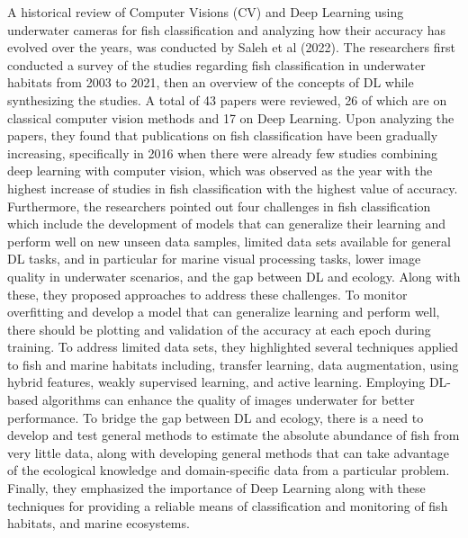 A historical review of Computer Visions (CV) and Deep Learning using underwater cameras for fish classification and analyzing how their accuracy has evolved over the years, was conducted by Saleh et al (2022). The researchers first conducted a survey of the studies regarding fish classification in underwater habitats from 2003 to 2021, then an overview of the concepts of DL while synthesizing the studies. A total of 43 papers were reviewed, 26 of which are on classical computer vision methods and 17 on Deep Learning. Upon analyzing the papers, they found that publications on fish classification have been gradually increasing, specifically in 2016 when there were already few studies combining deep learning with computer vision, which was observed as the year with the highest increase of studies in fish classification with the highest value of accuracy. Furthermore, the researchers pointed out four challenges in fish classification which include the development of models that can generalize their learning and perform well on new unseen data samples, limited data sets available for general DL tasks, and in particular for marine visual processing tasks, lower image quality in underwater scenarios, and the gap between DL and ecology. Along with these, they proposed approaches to address these challenges. To monitor overfitting and develop a model that can generalize learning and perform well, there should be plotting and validation of the accuracy at each epoch during training. To address limited data sets, they highlighted several techniques applied to fish and marine habitats including, transfer learning, data augmentation, using hybrid features, weakly supervised learning, and active learning. Employing DL-based algorithms can enhance the quality of images underwater for better performance. To bridge the gap between DL and ecology, there is a need to develop and test general methods to estimate the absolute abundance of fish from very little data, along with developing general methods that can take advantage of the ecological knowledge and domain-specific data from a particular problem. Finally, they emphasized the importance of Deep Learning along with these techniques for providing a reliable means of classification and monitoring of fish habitats, and marine ecosystems. 

